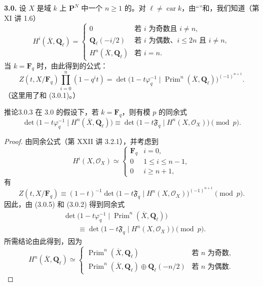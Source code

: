 \textbf{3.0.} 设 $X$ 是域 $k$ 上 $\mathbf P^N$ 中一个 $n\geq1$ 的。对 $\ell\ne\operatorname{car}k$，由“”和，我们知道（第 XI 讲 1.6）
\[
 H^i(\overline X,\mathbf Q_\ell)=
 \begin{cases}
 0&\text{若 }i\text{ 为奇数且 }i\ne n,\\
 \mathbf Q_\ell(-i/2)&\text{若 }i\text{ 为偶数、}i\leq2n\text{ 且 }i\ne n,\\
 H^n(\overline X,\mathbf Q_\ell)&\text{若 }i=n.
 \end{cases}
 \tag{3.0.1}
\]
当 $k=\mathbf F_q$ 时，由此得到的公式：
\[
 Z(t,X/\mathbf F_q)\prod_{i=0}^n(1-q^it)
 =\det\bigl(1-t\varphi_q^{-1}\mid
 \operatorname{Prim}^n(\overline X,\mathbf Q_\ell)\bigr)^{(-1)^{n+1}}.
 \tag{3.0.2}
\]
（这里用了和 (3.0.1)。）
\begin{SGAresult}{推论}{3.0.3}
在 3.0 的假设下，若 $k=\mathbf F_q$，则有模 $p$ 的同余式
\[
 \det\bigl(1-t\varphi_q^{-1}\mid H^n(\overline X,\mathbf Q_\ell)\bigr)
 \equiv\det\bigl(1-t\mathfrak F_q\mid H^n(X,\mathcal O_X)\bigr)\pmod p.
\]
\end{SGAresult}
\begin{proof}
由同余公式（第 XXII 讲 3.2.1），并考虑到
\[
 H^i(X,\mathcal O_X)\simeq
 \begin{cases}
 \mathbf F_q&i=0,\\
 0&1\leq i\leq n-1,\\
 0&i\geq n+1,
 \end{cases}
 \tag{3.0.4}
\]
有
\[
 Z(t,X/\mathbf F_q)\equiv(1-t)^{-1}
 \det\bigl(1-t\mathfrak F_q\mid H^n(X,\mathcal O_X)\bigr)^{(-1)^{n+1}}
 \pmod p.
 \tag{3.0.5}
\]
因此，由 (3.0.5) 和 (3.0.2) 得到同余式
\[
 \begin{aligned}
 {}&\det\bigl(1-t\varphi_q^{-1}\mid
 \operatorname{Prim}^n(\overline X,\mathbf Q_\ell)\bigr)\\
 &\hspace{2em}\equiv\det\bigl(1-t\mathfrak F_q\mid H^n(X,\mathcal O_X)\bigr)\pmod p.
 \end{aligned}
 \tag{3.0.6}
\]
所需结论由此得到，因为
\[
 H^n(\overline X,\mathbf Q_\ell)\simeq
 \begin{cases}
 \operatorname{Prim}^n(\overline X,\mathbf Q_\ell)&\text{若 }n\text{ 为奇数},\\
 \operatorname{Prim}^n(\overline X,\mathbf Q_\ell)\oplus\mathbf Q_\ell(-n/2)
 &\text{若 }n\text{ 为偶数}.
 \end{cases}
 \tag{3.0.7}
\]
\end{proof}

